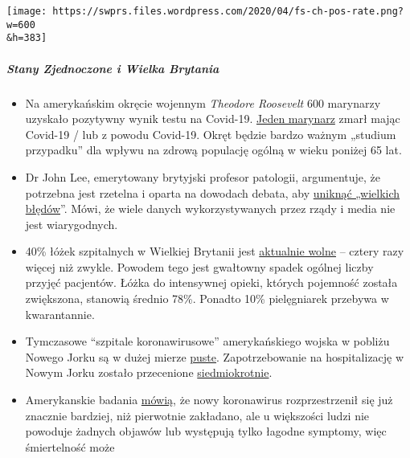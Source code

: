 \texttt{[image: https://swprs.files.wordpress.com/2020/04/fs-ch-pos-rate.png?w=600\\\&h=383]}

\hypertarget{stany-zjednoczone-i-wielka-brytania}{%
\subparagraph{\texorpdfstring{\textbf{Stany Zjednoczone i Wielka
Brytania}}{Stany Zjednoczone i Wielka Brytania}}\label{stany-zjednoczone-i-wielka-brytania}}

\begin{itemize}
\tightlist
\item
  Na amerykańskim okręcie wojennym \emph{Theodore Roosevelt} 600
  marynarzy uzyskało pozytywny wynik testu na Covid-19.
  \href{https://www.theguardian.com/world/2020/apr/14/sailor-dies-from-covid-19-and-600-test-positive-after-outbreak-on-uss-theodore-roosevelt-guam}{Jeden
  marynarz} zmarł mając Covid-19 / lub z powodu Covid-19. Okręt będzie
  bardzo ważnym „studium przypadku'' dla wpływu na zdrową populację
  ogólną w wieku poniżej 65 lat.
\item
  Dr John Lee, emerytowany brytyjski profesor patologii, argumentuje, że
  potrzebna jest rzetelna i oparta na dowodach debata, aby
  \href{https://www.spectator.co.uk/article/to-understand-covid-we-need-evidence-scepticism-and-vigorous-debate}{uniknąć
  „wielkich błędów}''. Mówi, że wiele danych wykorzystywanych przez
  rządy i media nie jest wiarygodnych.
\item
  40\% łóżek szpitalnych w Wielkiej Brytanii jest
  \href{https://www.hsj.co.uk/acute-care/nhs-hospitals-have-four-times-more-empty-beds-than-normal/7027392.article}{aktualnie
  wolne} -- cztery razy więcej niż zwykle. Powodem tego jest gwałtowny
  spadek ogólnej liczby przyjęć pacjentów. Łóżka do intensywnej opieki,
  których pojemność została zwiększona, stanowią średnio 78\%. Ponadto
  10\% pielęgniarek przebywa w kwarantannie.
\item
  Tymczasowe ``szpitale koronawirusowe'' amerykańskiego wojska w pobliżu
  Nowego Jorku są w dużej mierze
  \href{https://nypost.com/2020/04/09/usns-comfort-and-javits-center-mostly-empty-amid-coronavirus/}{puste}.
  Zapotrzebowanie na hospitalizację w Nowym Jorku zostało przecenione
  \href{https://www.nytimes.com/2020/04/10/nyregion/new-york-coronavirus-hospitals.html}{siedmiokrotnie}.
\item
  Amerykanskie badania
  \href{https://www.medrxiv.org/content/10.1101/2020.04.01.20050542v1}{mówią},
  że nowy koronawirus rozprzestrzenił się już znacznie bardziej, niż
  pierwotnie zakładano, ale u większości ludzi nie powoduje żadnych
  objawów lub występują tylko łagodne symptomy, więc śmiertelność może

\end{itemize}
